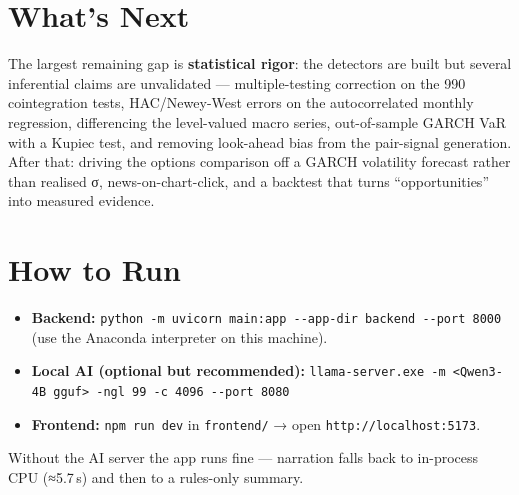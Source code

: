 \documentclass[11pt]{article}
\newcommand{\tk}[1]{\texttt{#1}}
\begin{document}
\section{What's Next}
The largest remaining gap is \textbf{statistical rigor}: the detectors are built but
several inferential claims are unvalidated — multiple-testing correction on the 990
cointegration tests, HAC/Newey-West errors on the autocorrelated monthly regression,
differencing the level-valued macro series, out-of-sample GARCH VaR with a Kupiec
test, and removing look-ahead bias from the pair-signal generation. After that:
driving the options comparison off a GARCH volatility forecast rather than realised σ,
news-on-chart-click, and a backtest that turns ``opportunities'' into measured evidence.

\section{How to Run}
\begin{itemize}
\item \textbf{Backend:} \tk{python -m uvicorn main:app -{}-app-dir backend -{}-port 8000}
(use the Anaconda interpreter on this machine).
\item \textbf{Local AI (optional but recommended):}
\tk{llama-server.exe -m <Qwen3-4B gguf> -ngl 99 -c 4096 -{}-port 8080}
\item \textbf{Frontend:} \tk{npm run dev} in \tk{frontend/} → open
\tk{http://localhost:5173}.
\end{itemize}
Without the AI server the app runs fine — narration falls back to in-process CPU
(≈5.7\,s) and then to a rules-only summary.
\end{document}
